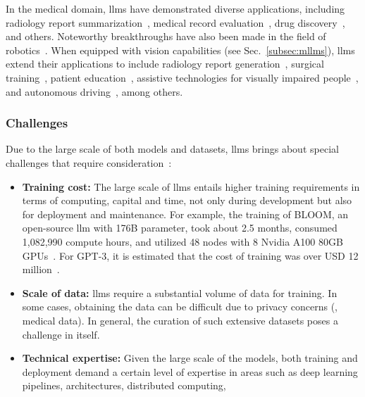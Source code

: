 In the medical domain, \glspl{llm} have demonstrated diverse applications, including radiology report summarization~\cite{van2023clinical}, medical record evaluation~\cite{schubert2023large}, drug discovery~\cite{pal2023chatgpt}, and others. Noteworthy breakthroughs have also been made in the field of robotics~\cite{ma2023eureka}. When equipped with vision capabilities (see Sec.~\ref{subsec:mllms}), \glspl{llm} extend their applications to include radiology report generation~\cite{wang2023r2gengpt}, surgical training~\cite{varas2023innovations,mohapatra2023leveraging}, patient education~\cite{mesko2023impact}, assistive technologies for visually impaired people~\cite{wu2023multimodal}, and autonomous driving~\cite{cui2024survey}, among others. 

\subsubsection{Challenges}

Due to the large scale of both models and datasets, \glspl{llm} brings about special challenges that require consideration~\cite{nvidiaWhatLarge}:

\begin{itemize}
    \item \textbf{Training cost:} The large scale of \glspl{llm} entails higher training requirements in terms of computing, capital and time, not only during development but also for deployment and maintenance. For example, the training of BLOOM, an open-source \gls{llm} with 176B parameter, took about 2.5 months, consumed 1,082,990 compute hours, and utilized 48 nodes with 8 Nvidia A100 80GB GPUs~\cite{workshop2022bloom}. For GPT-3, it is estimated that the cost of training was over USD 12 million~\cite{forbesCouncilPost}.

    \item \textbf{Scale of data:} \glspl{llm} require a substantial volume of data for training. In some cases, obtaining the data can be difficult due to privacy concerns (\eg, medical data). In general, the curation of such extensive datasets poses a challenge in itself.

    \item \textbf{Technical expertise:} Given the large scale of the models, both training and deployment demand a certain level of expertise in areas such as deep learning pipelines, architectures, distributed computing, \etc
    
\end{itemize}

